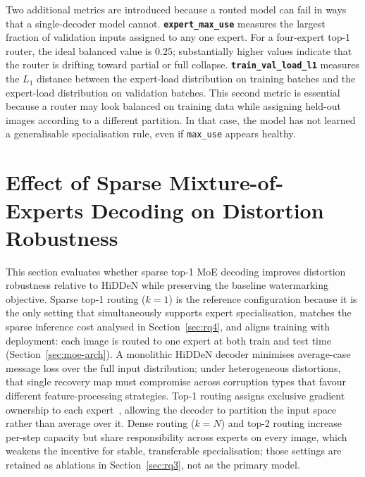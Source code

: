 ﻿\documentclass[12pt, a4paper, twoside]{report}
\numberwithin{equation}{chapter}
\begin{document}
Two additional metrics are introduced because a routed model can fail in ways that a single-decoder model cannot. \textbf{\texttt{expert\_max\_use}} measures the largest fraction of validation inputs assigned to any one expert. For a four-expert top-1 router, the ideal balanced value is $0.25$; substantially higher values indicate that the router is drifting toward partial or full collapse. \textbf{\texttt{train\_val\_load\_l1}} measures the $L_1$ distance between the expert-load distribution on training batches and the expert-load distribution on validation batches. This second metric is essential because a router may look balanced on training data while assigning held-out images according to a different partition. In that case, the model has not learned a generalisable specialisation rule, even if \texttt{max\_use} appears healthy.




\section{Effect of Sparse Mixture-of-Experts Decoding on Distortion Robustness}
\label{sec:rq1rq2}

This section evaluates whether sparse top-1 MoE decoding improves distortion robustness relative to HiDDeN while preserving the baseline watermarking objective. Sparse top-1 routing ($k{=}1$) is the reference configuration because it is the only setting that simultaneously supports expert specialisation, matches the sparse inference cost analysed in Section~\ref{sec:rq4}, and aligns training with deployment: each image is routed to one expert at both train and test time (Section~\ref{sec:moe-arch}). A monolithic HiDDeN decoder minimises average-case message loss over the full input distribution; under heterogeneous distortions, that single recovery map must compromise across corruption types that favour different feature-processing strategies. Top-1 routing assigns exclusive gradient ownership to each expert~\citep{fedus2022}, allowing the decoder to partition the input space rather than average over it. Dense routing ($k{=}N$) and top-2 routing increase per-step capacity but share responsibility across experts on every image, which weakens the incentive for stable, transferable specialisation; those settings are retained as ablations in Section~\ref{sec:rq3}, not as the primary model.
\end{document}
